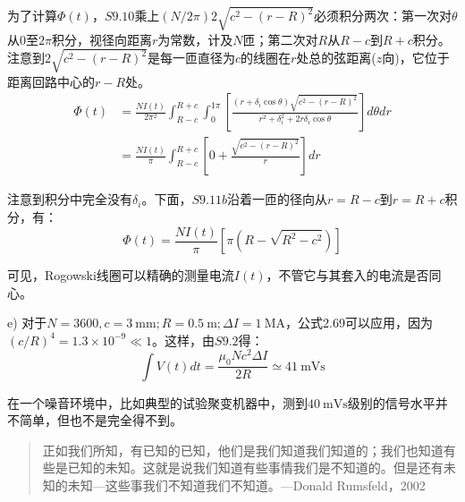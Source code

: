 为了计算$\Phi(t)$，$S9.10$乘上$(N/2\pi)2\sqrt{c^2−(r−R)^2}$必须积分两次：第一次对$\theta$从$0$至$2\pi$积分，视径向距离$r$为常数，计及$N$匝；第二次对$R$从$R-c$到$R+c$积分。注意到$2\sqrt{c^2−(r−R)^2}$是每一匝直径为$c$的线圈在$r$处总的弦距离($z$向)，它位于距离回路中心的$r-R$处。
\begin{align}
\Phi(t)&=\frac{N I(t)}{2\pi^2}\int_{R-c}^{R+c}\int_{0}^{1\pi}\left[ \frac{(r+\delta_i \cos\theta)\sqrt{c^2-(r-R)^2}}{r^2+\delta_i^2+2r\delta_i \cos\theta}\right]d\theta dr\nonumber\tag{S9.11a}\\
&=\frac{N I(t)}{\pi}\int_{R-c}^{R+c} \left[ 0+\frac{\sqrt{c^2-(r-R)^2}}{r}\right]dr\nonumber\tag{S9.11b}
\end{align}

注意到积分中完全没有$\delta_i$。下面，$S9.11b$沿着一匝的径向从$r=R-c$到$r=R+c$积分，有：
\begin{equation*}
\Phi(t)=\frac{N I(t)}{\pi}\left[ \pi(R-\sqrt{R^2-c^2})\right] \tag{S9.11c}
\end{equation*}

可见，Rogowski线圈可以精确的测量电流$I(t)$，不管它与其套入的电流是否同心。

e) 对于$N = 3600, c = 3\ \mathrm{mm}; R = 0.5\ \mathrm{m}; \Delta I = 1\ \mathrm{MA}$，公式2.69可以应用，因为$(c/R)^4 = 1.3×10^{−9}\ll 1$。这样，由$S9.2$得：
$$\int V(t)dt=\frac{\mu_0 N c^2 \Delta I}{2R}\simeq 41\ \mathrm{mVs}$$

在一个噪音环境中，比如典型的试验聚变机器中，测到$40\ \mathrm{mVs}$级别的信号水平并不简单，但也不是完全得不到。

\begin{quotation}
\kaishu 正如我们所知，有已知的已知，他们是我们知道我们知道的；我们也知道有些是已知的未知。这就是说我们知道有些事情我们是不知道的。但是还有未知的未知---这些事我们不知道我们不知道。---Donald Rumsfeld，2002
\end{quotation}